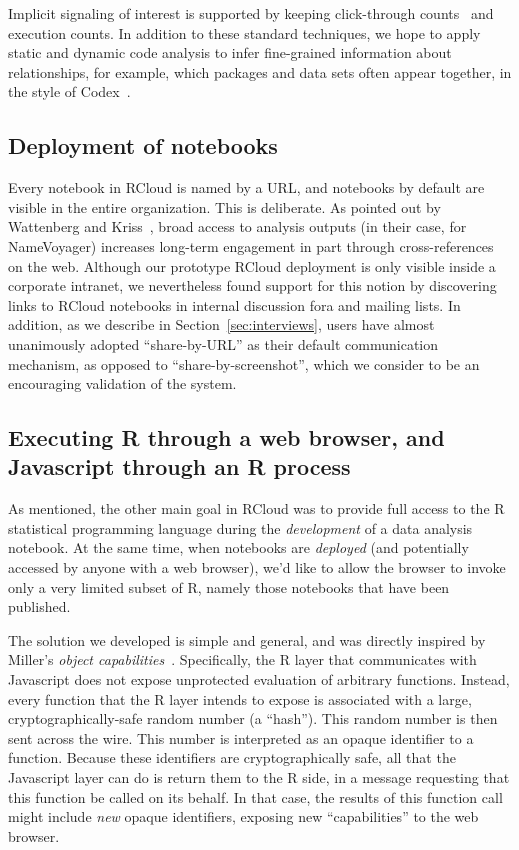 Implicit signaling of interest is supported by keeping click-through
counts~\cite{Joachims:2005:AIC} and execution counts. In addition to
these standard techniques, we hope to apply static and dynamic code
analysis to infer fine-grained information about relationships,
for example, which packages and data sets often appear together,
in the style of Codex~\cite{Fast:2014:ECS}.

\subsection{Deployment of notebooks\label{sec:deployment}}

Every notebook in RCloud is named by a URL, and notebooks by default
are visible in the entire organization. This is deliberate.
As pointed out by Wattenberg and Kriss~\cite{Wattenberg:2011:DFS},
broad access to analysis outputs (in their case, for NameVoyager) increases
long-term engagement in part through cross-references on the
web. Although our prototype RCloud deployment is only visible inside a
corporate intranet, we nevertheless found support for this notion by
discovering links to RCloud notebooks in internal discussion fora and
mailing lists. In addition, as we describe in
Section~\ref{sec:interviews}, users have almost unanimously adopted
``share-by-URL'' as their default communication mechanism, as opposed
to ``share-by-screenshot'', which we consider to be an encouraging
validation of the system.

\subsection{Executing R through a web browser, and Javascript through an R process\label{sec:Rinbrowser}}

As mentioned, the other main goal in RCloud was to provide
full access to the R statistical programming language during the
\emph{development} of a data analysis notebook.
At the same time, when notebooks are \emph{deployed} (and potentially
accessed by anyone with a web browser), we'd like to allow the
browser to invoke only a very limited subset of R, namely those
notebooks that have been published.

The solution we developed is simple and general, and was directly
inspired by Miller's \emph{object
  capabilities}~\cite{Miller:2006:RCT}. Specifically, the R layer that
communicates with Javascript does not expose unprotected evaluation of
arbitrary functions. Instead, every function that the R layer intends
to expose is associated with a large, cryptographically-safe random
number (a ``hash''). This random number is then sent
across the wire. This number is interpreted as an opaque identifier to
a function. Because these identifiers are cryptographically safe, all
that the Javascript layer can do is return them to the R side, in a
message requesting that this function be called on its behalf. In that
case, the results of this function call might include \emph{new}
opaque identifiers, exposing new ``capabilities'' to the web browser.


